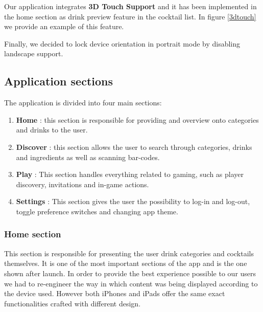 \documentclass[paper=a4, fontsize=12pt]{scrartcl}
\numberwithin{equation}{section}		%
\numberwithin{figure}{section}			%
\numberwithin{table}{section}				%
\begin{document}
Our application integrates \textbf{3D Touch Support} and it has been implemented in the home section as drink preview feature in the cocktail list. In figure \ref{3dtouch} we provide an example of this feature.

Finally, we decided to lock device orientation in portrait mode by disabling landscape support.

\subsection{Application sections}

The application is divided into four main sections:

\begin{enumerate}
\item \textbf{Home} : this section is responsible for providing and overview onto categories and drinks to the user. 
\item \textbf{Discover} : this section allows the user to search through categories, drinks and ingredients as well as scanning bar-codes.
\item \textbf{Play} : This section handles everything related to gaming, such as player discovery, invitations and in-game actions.
\item \textbf{Settings} : This section gives the user the possibility to log-in and log-out, toggle preference switches and changing app theme.
\end{enumerate}

\subsubsection{Home section}

This section is responsible for presenting the user drink categories and cocktails themselves. It is one of the most important sections of the app and is the one shown after launch. In order to provide the best experience possible to our users we had to re-engineer the way in which content was being displayed according to the device used. However both iPhones and iPads offer the same exact functionalities crafted with different design.
\end{document}
